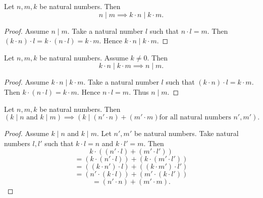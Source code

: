 \documentclass[10pt]{article}
\begin{document}
  \begin{forthel}
    \begin{proposition}
      Let $n, m, k$ be natural numbers.
      Then \[ n \mid m \implies k \cdot n \mid k \cdot m. \]
    \end{proposition}
    \begin{proof}
      Assume $n \mid m$.
      Take a natural number $l$ such that $n \cdot l = m$.
      Then $(k \cdot n) \cdot l
        = k \cdot (n \cdot l)
        = k \cdot m$.
      Hence $k \cdot n \mid k \cdot m$.
    \end{proof}
  \end{forthel}

  \begin{forthel}
    \begin{proposition}
      Let $n, m, k$ be natural numbers.
      Assume $k \neq 0$.
      Then \[ k \cdot n \mid k \cdot m \implies n \mid m. \]
    \end{proposition}
    \begin{proof}
      Assume $k \cdot n \mid k \cdot m$.
      Take a natural number $l$ such that $(k \cdot n) \cdot l = k \cdot m$.
      Then $k \cdot (n \cdot l) = k \cdot m$.
      Hence $n \cdot l = m$.
      Thus $n \mid m$.
    \end{proof}
  \end{forthel}

  \begin{forthel}
    \begin{proposition}
      Let $n, m, k$ be natural numbers.
      Then \[ (\text{$k \mid n$ and $k \mid m$}) \implies
      (\text{$k \mid (n' \cdot n) + (m' \cdot m)$
      for all natural numbers $n', m'$}). \]
    \end{proposition}
    \begin{proof}
      Assume $k \mid n$ and $k \mid m$.
      Let $n', m'$ be natural numbers.
      Take natural numbers $l,l'$ such that $k \cdot l = n$ and $k \cdot l' = m$.
      Then
      \[  k \cdot ((n' \cdot l) + (m' \cdot l'))                \]
      \[    = (k \cdot (n' \cdot l)) + (k \cdot (m' \cdot l'))  \]
      \[    = ((k \cdot n') \cdot l) + ((k \cdot m') \cdot l')  \]
      \[    = (n' \cdot (k \cdot l)) + (m' \cdot (k \cdot l'))  \]
      \[    = (n' \cdot n) + (m' \cdot m).                      \]
    \end{proof}
  \end{forthel}
\end{document}
